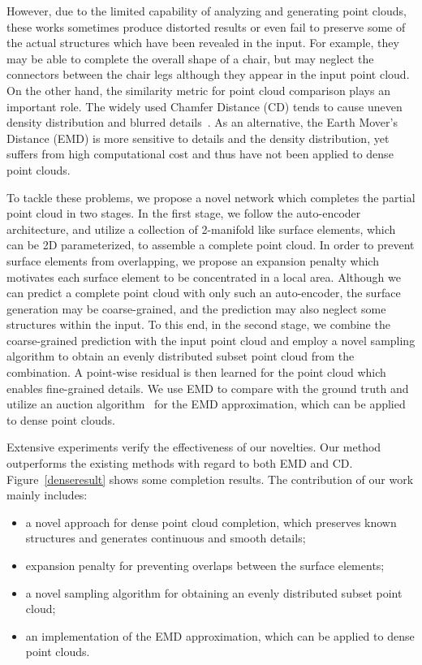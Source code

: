 \documentclass[letterpaper]{article} \usepackage{aaai20}  \usepackage{times}  \usepackage{helvet} \usepackage{courier}  \usepackage[hyphens]{url}  \usepackage{graphicx} \urlstyle{rm} \def\UrlFont{\rm}  \usepackage{graphicx}  \frenchspacing  \setlength{\pdfpagewidth}{8.5in}  \setlength{\pdfpageheight}{11in}  \usepackage{amsmath}
\begin{document}
However, due to the limited capability of analyzing and generating point clouds, these works sometimes produce distorted results or even fail to preserve some of the actual structures which have been revealed in the input. For example, they may be able to complete the overall shape of a chair, but may neglect the connectors between the chair legs although they appear in the input point cloud. On the other hand, the similarity metric for point cloud comparison plays an important role. The widely used Chamfer Distance (CD) tends to cause uneven density distribution and blurred details~\cite{achlioptas2017learning}. As an alternative, the Earth Mover's Distance (EMD) is more sensitive to details and the density distribution, yet suffers from high computational cost and thus have not been applied to dense point clouds.

To tackle these problems, we propose a novel network which completes the partial point cloud in two stages. In the first stage, we follow the auto-encoder architecture, and utilize a collection of 2-manifold like surface elements, which can be 2D parameterized, to assemble a complete point cloud. In order to prevent surface elements from overlapping, we propose an expansion penalty which motivates each surface element to be concentrated in a local area. Although we can predict a complete point cloud with only such an auto-encoder, the surface generation may be coarse-grained, and the prediction may also neglect some structures within the input. To this end, in the second stage, we combine the coarse-grained prediction with the input point cloud and employ a novel sampling algorithm to obtain an evenly distributed subset point cloud from the combination. A point-wise residual is then learned for the point cloud which enables fine-grained details. We use EMD to compare with the ground truth and utilize an auction algorithm~\cite{bertsekas1992auction} for the EMD approximation, which can be applied to dense point clouds. 

Extensive experiments verify the effectiveness of our novelties. Our method outperforms the existing methods with regard to both EMD and CD. Figure~\ref{denseresult} shows some completion results. The contribution of our work mainly includes:
\begin{itemize}
\item a novel approach for dense point cloud completion, which preserves known structures and generates continuous and smooth details;
\item expansion penalty for preventing overlaps between the surface elements;
\item a novel sampling algorithm for obtaining an evenly distributed subset point cloud;
\item an implementation of the EMD approximation, which can be applied to dense point clouds.
\end{itemize}
\end{document}
